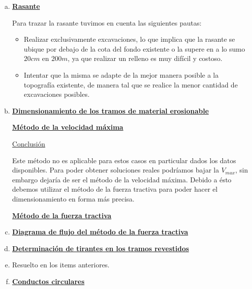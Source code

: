 \documentclass[10.5pt]{article}
\begin{document}
\begin{enumerate}[a)]
 \item \underline{\bf Rasante}
 
 Para trazar la rasante tuvimos en cuenta las siguientes pautas:
  \begin{itemize}
   \item Realizar exclusivamente excavaciones, lo que implica que la rasante se ubique por debajo de la cota del fondo existente o la supere
   en a lo sumo $20 cm$ en $200 m$, ya que realizar un relleno es muy difícil y costoso.
   \item Intentar que la misma se adapte de la mejor manera posible a la topografía existente, de manera tal que se realice la menor cantidad
   de excavaciones posibles.
  \end{itemize}
  
 \item \underline{\bf Dimensionamiento de los tramos de material erosionable}
    
  \vspace{1em}
  \underline{\bf Método de la velocidad máxima}
  
  
  
  
  
  \underline{Conclusión}
  
  Este método no es aplicable para estos casos en particular dados los datos disponibles.
  Para poder obtener soluciones reales podríamos bajar la $V_{max}$, sin embargo dejaría de ser el método de la velocidad máxima.
  Debido a ésto debemos utilizar el método de la fuerza tractiva para poder hacer el dimensionamiento en forma más precisa.
  
  \vspace{1em}
  \underline{\bf Método de la fuerza tractiva}
  
  
  
  
 
 \newpage
 \item \underline{\bf Diagrama de flujo del método de la fuerza tractiva}
   
   
   
 \item \underline{\bf Determinación de tirantes en los tramos revestidos}

   
   

 \item Resuelto en los items anteriores.
   
 \item \underline{\bf Conductos circulares}
 

\end{enumerate}
\end{document}
